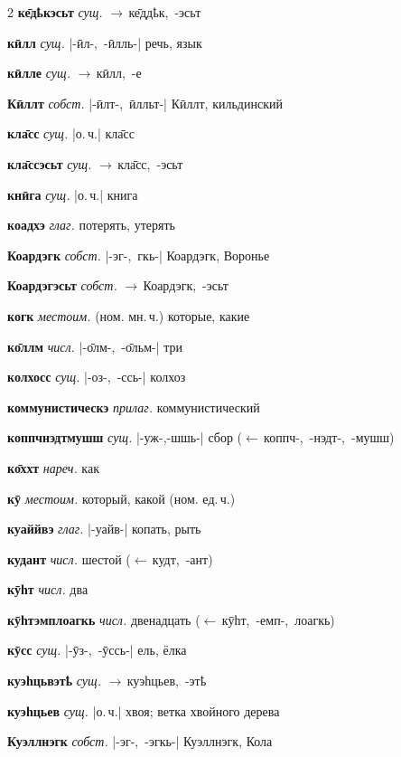 \documentclass[10pt, a5paper,openany,twoside]{ksdp}
\begin{document}
\begin{multicols}{2}
\textbf{ке̄дҍкэсьт} \textit{сущ.} \mbox{$\rightarrow$\,ке̄ддҍк, -эсьт}

\textbf{кӣлл} \textit{сущ.} \mbox{|-ӣл-, -ӣлль-|} речь, язык

\textbf{кӣлле} \textit{сущ.} \mbox{$\rightarrow$\,кӣлл, -е}

\textbf{Кӣллт} \textit{собст.} \mbox{|-ӣлт-, ӣлльт-|} Кӣллт, кильдинский

\textbf{кла̄сс} \textit{сущ.} \mbox{|о.\,ч.|} кла̄сс

\textbf{кла̄ссэсьт} \textit{сущ.} \mbox{$\rightarrow$\,кла̄сс, -эсьт}

\textbf{кнӣга} \textit{сущ.} \mbox{|о.\,ч.|} книга

\textbf{коадхэ} \textit{глаг.} потерять, утерять

\textbf{Коардэгк} \textit{собст.} \mbox{|-эг-, гкь-|} Коардэгк, Воронье

\textbf{Коардэгэсьт} \textit{собст.} \mbox{$\rightarrow$\,Коардэгк, -эсьт}

\textbf{когк} \textit{местоим.} (ном. мн.\,ч.) которые, какие

\textbf{ко̄ллм} \textit{числ.} \mbox{|-о̄лм-, -о̄льм-|} три

\textbf{колхосс} \textit{сущ.} \mbox{|-оз-, -ссь-|} колхоз

\textbf{коммунистическэ} \textit{прилаг.} коммунистический

\textbf{коппчнэдтмушш} \textit{сущ.} \mbox{|-уж-,-шшь-|} сбор \mbox{($\leftarrow$\,коппч-, -нэдт-, -мушш)}

\textbf{ко̄ххт} \textit{нареч.} как

\textbf{кӯ} \textit{местоим.} который, какой (ном. ед.\,ч.)

\textbf{куаййвэ} \textit{глаг.} \mbox{|-уайв-|} копать, рыть

\textbf{кудант} \textit{числ.} шестой \mbox{($\leftarrow$\,кудт, -ант)}

\textbf{кӯһт} \textit{числ.} два

\textbf{кӯһтэмплоагкь} \textit{числ.} двенадцать \mbox{($\leftarrow$\,кӯһт, -емп-, лоагкь)}

\textbf{кӯсс} \textit{сущ.} \mbox{|-ӯз-, -ӯссь-|} ель, ёлка

\textbf{куэһцьвэтҍ} \textit{сущ.} \mbox{$\rightarrow$\,куэһцьев, -этҍ}

\textbf{куэһцьев} \textit{сущ.} \mbox{|о.\,ч.|} хвоя; ветка хвойного дерева

\textbf{Куэллнэгк} \textit{собст.} \mbox{|-эг-, -эгкь-|} Куэллнэгк, Кола


\end{multicols}
\end{document}
